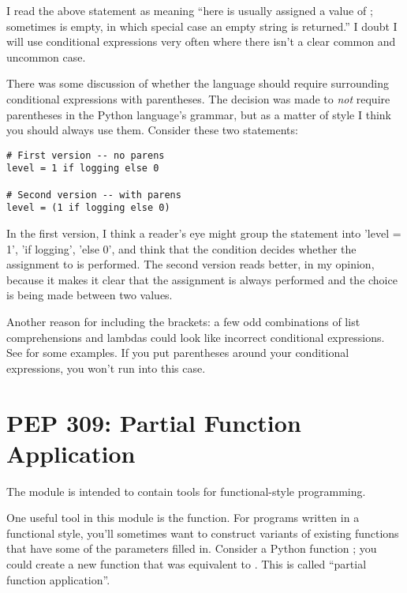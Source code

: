 \documentclass{howto}
\begin{document}
I read the above statement as meaning ``here  is 
usually assigned a value of ; sometimes 
 is empty, in which special case an empty string is returned.''  
I doubt I will use conditional expressions very often where there 
isn't a clear common and uncommon case.

There was some discussion of whether the language should require
surrounding conditional expressions with parentheses.  The decision
was made to \emph{not} require parentheses in the Python language's
grammar, but as a matter of style I think you should always use them.
Consider these two statements:

\begin{verbatim}
# First version -- no parens
level = 1 if logging else 0

# Second version -- with parens
level = (1 if logging else 0)
\end{verbatim}

In the first version, I think a reader's eye might group the statement
into 'level = 1', 'if logging', 'else 0', and think that the condition
decides whether the assignment to  is performed.  The
second version reads better, in my opinion, because it makes it clear
that the assignment is always performed and the choice is being made
between two values.

Another reason for including the brackets: a few odd combinations of
list comprehensions and lambdas could look like incorrect conditional
expressions. See  for some examples.  If you put parentheses
around your conditional expressions, you won't run into this case.


\begin{seealso}


\end{seealso}


\section{PEP 309: Partial Function Application\label{pep-309}}

The  module is intended to contain tools for
functional-style programming.  

One useful tool in this module is the  function.
For programs written in a functional style, you'll sometimes want to
construct variants of existing functions that have some of the
parameters filled in.  Consider a Python function ;
you could create a new function  that was equivalent to
.  This is called ``partial function application''.
\end{document}
